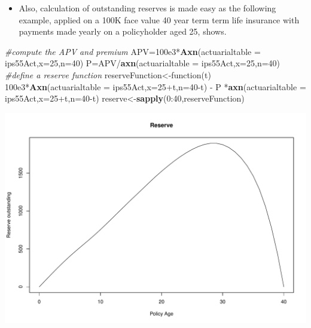 \documentclass[ignorenonframetext,]{beamer}
\newenvironment{Shaded}{\begin{snugshade}}{\end{snugshade}}
\newcommand{\KeywordTok}[1]{\textcolor[rgb]{0.13,0.29,0.53}{\textbf{{#1}}}}
\newcommand{\DataTypeTok}[1]{\textcolor[rgb]{0.13,0.29,0.53}{{#1}}}
\newcommand{\DecValTok}[1]{\textcolor[rgb]{0.00,0.00,0.81}{{#1}}}
\newcommand{\FloatTok}[1]{\textcolor[rgb]{0.00,0.00,0.81}{{#1}}}
\newcommand{\StringTok}[1]{\textcolor[rgb]{0.31,0.60,0.02}{{#1}}}
\newcommand{\CommentTok}[1]{\textcolor[rgb]{0.56,0.35,0.01}{\textit{{#1}}}}
\newcommand{\NormalTok}[1]{{#1}}
\begin{document}
\begin{frame}[fragile]

\begin{itemize}[<+->]
\itemsep1pt\parskip0pt
\item
  Also, calculation of outstanding reserves is made easy as the
  following example, applied on a 100K face value 40 year term term life
  insurance with payments made yearly on a policyholder aged 25, shows.
\end{itemize}

\begin{Shaded}
\begin{Highlighting}[]
\CommentTok{#compute the APV and premium}
\NormalTok{APV=}\FloatTok{100e3}\NormalTok{*}\KeywordTok{Axn}\NormalTok{(}\DataTypeTok{actuarialtable =} \NormalTok{ips55Act,}\DataTypeTok{x=}\DecValTok{25}\NormalTok{,}\DataTypeTok{n=}\DecValTok{40}\NormalTok{) }
\NormalTok{P=APV/}\KeywordTok{axn}\NormalTok{(}\DataTypeTok{actuarialtable =} \NormalTok{ips55Act,}\DataTypeTok{x=}\DecValTok{25}\NormalTok{,}\DataTypeTok{n=}\DecValTok{40}\NormalTok{)}
\CommentTok{#define a reserve function}
\NormalTok{reserveFunction<-function(t) }
  \FloatTok{100e3}\NormalTok{*}\KeywordTok{Axn}\NormalTok{(}\DataTypeTok{actuarialtable =} \NormalTok{ips55Act,}\DataTypeTok{x=}\DecValTok{25}\NormalTok{+t,}\DataTypeTok{n=}\DecValTok{40}\NormalTok{-t) -}\StringTok{ }
\StringTok{  }\NormalTok{P *}\KeywordTok{axn}\NormalTok{(}\DataTypeTok{actuarialtable =} \NormalTok{ips55Act,}\DataTypeTok{x=}\DecValTok{25}\NormalTok{+t,}\DataTypeTok{n=}\DecValTok{40}\NormalTok{-t)}
\NormalTok{reserve<-}\KeywordTok{sapply}\NormalTok{(}\DecValTok{0}\NormalTok{:}\DecValTok{40}\NormalTok{,reserveFunction)}
\end{Highlighting}
\end{Shaded}

\end{frame}

\begin{frame}

\begin{center}\includegraphics{introToLifecontingencies_files/figure-beamer/reserves2-1} \end{center}

\end{frame}
\end{document}
